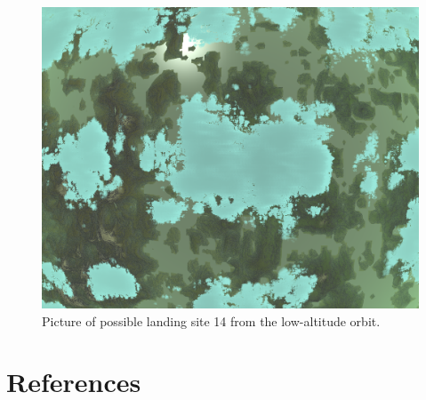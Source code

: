 \documentclass[reprint,english,notitlepage]{revtex4-2}
\begin{document}
    \begin{figure}[h]
        \centering
        \includegraphics[scale=0.14]{Figures/l_site14}
        \caption{Picture of possible landing site 14 from the low-altitude orbit.}\label{fig:l_site14}
    \end{figure}

\section*{References} \label{sec: references}
\end{document}
